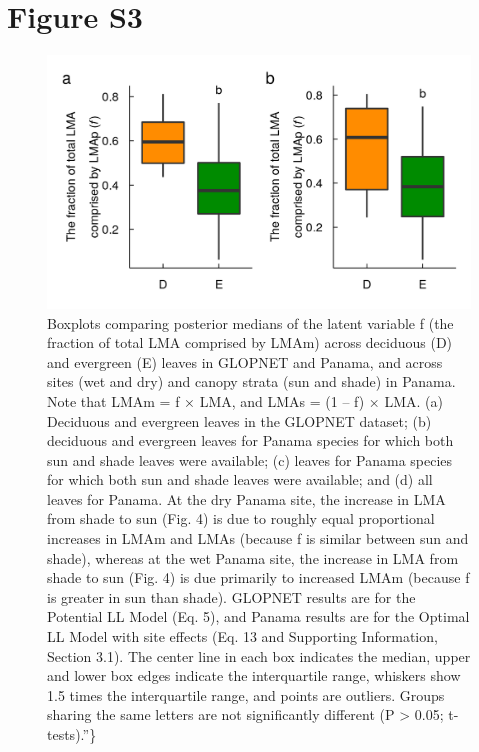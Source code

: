\documentclass[
  12pt,
  letterpaper,
  DIV=11,
  numbers=noendperiod]{scrartcl}
\begin{document}
\newpage

\hypertarget{figure-s3}{%
\section{Figure S3}\label{figure-s3}}

\begin{figure}

{\centering \includegraphics{../figs/box_frac.png}

}

\caption{\label{fig-box_frac}Boxplots comparing posterior medians of the
latent variable f (the fraction of total LMA comprised by LMAm) across
deciduous (D) and evergreen (E) leaves in GLOPNET and Panama, and across
sites (wet and dry) and canopy strata (sun and shade) in Panama. Note
that LMAm = f × LMA, and LMAs = (1 -- f) × LMA. (a) Deciduous and
evergreen leaves in the GLOPNET dataset; (b) deciduous and evergreen
leaves for Panama species for which both sun and shade leaves were
available; (c) leaves for Panama species for which both sun and shade
leaves were available; and (d) all leaves for Panama. At the dry Panama
site, the increase in LMA from shade to sun (Fig. 4) is due to roughly
equal proportional increases in LMAm and LMAs (because f is similar
between sun and shade), whereas at the wet Panama site, the increase in
LMA from shade to sun (Fig. 4) is due primarily to increased LMAm
(because f is greater in sun than shade). GLOPNET results are for the
Potential LL Model (Eq. 5), and Panama results are for the Optimal LL
Model with site effects (Eq. 13 and Supporting Information, Section
3.1). The center line in each box indicates the median, upper and lower
box edges indicate the interquartile range, whiskers show 1.5 times the
interquartile range, and points are outliers. Groups sharing the same
letters are not significantly different (P \textgreater{} 0.05;
t-tests).''\}}

\end{figure}
\end{document}
